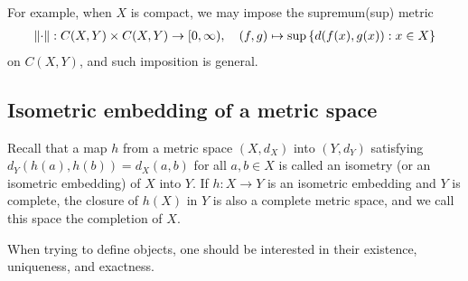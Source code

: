 For example, when $X$ is compact, we may impose the supremum(sup) metric
\begin{align*}
    {\left\lVert{\cdot}\right\rVert}: C(X, Y)\times C(X, Y)\rightarrow[0, \infty),
    \quad
    (f, g)\mapsto\sup\left\{d(f(x), g(x)): x\in X\right\}
\end{align*}
on $C(X, Y)$, and such imposition is general.

\subsection{Isometric embedding of a metric space}

Recall that a map $h$ from a metric space $(X, d_X)$ into $(Y, d_Y)$ satisfying $d_Y(h(a), h(b))=d_X(a, b)$ for all $a, b\in X$ is called an isometry (or an isometric embedding) of $X$ into $Y$.
If $h: X\rightarrow Y$ is an isometric embedding and $Y$ is complete, the closure of $h(X)$ in $Y$ is also a complete metric space, and we call this space the completion of $X$.

When trying to define objects, one should be interested in their existence, uniqueness, and exactness.

